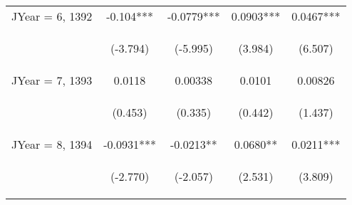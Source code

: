 \documentclass[]{article}
\begin{document}
\begin{center}
\begin{tabular}{lcccc}
        JYear = 6, 1392  & -0.104***                                       & -0.0779***                                     & 0.0903***                                      & 0.0467***                                      \\
        \vspace{4pt}     & \begin{footnotesize}(-3.794)\end{footnotesize}  & \begin{footnotesize}(-5.995)\end{footnotesize} & \begin{footnotesize}(3.984)\end{footnotesize}  & \begin{footnotesize}(6.507)\end{footnotesize}  \\
        JYear = 7, 1393  & 0.0118                                          & 0.00338                                        & 0.0101                                         & 0.00826                                        \\
        \vspace{4pt}     & \begin{footnotesize}(0.453)\end{footnotesize}   & \begin{footnotesize}(0.335)\end{footnotesize}  & \begin{footnotesize}(0.442)\end{footnotesize}  & \begin{footnotesize}(1.437)\end{footnotesize}  \\
        JYear = 8, 1394  & -0.0931***                                      & -0.0213**                                      & 0.0680**                                       & 0.0211***                                      \\
        \vspace{4pt}     & \begin{footnotesize}(-2.770)\end{footnotesize}  & \begin{footnotesize}(-2.057)\end{footnotesize} & \begin{footnotesize}(2.531)\end{footnotesize}  & \begin{footnotesize}(3.809)\end{footnotesize}  \\

\end{tabular}
\end{center}
\end{document}
